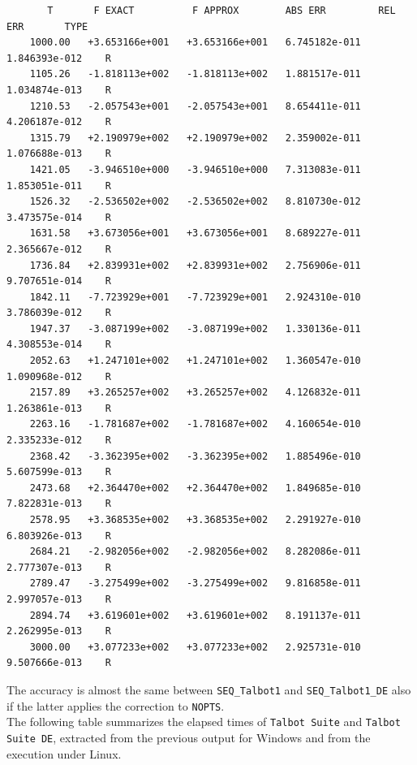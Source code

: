 \documentclass[a4paper,10pt]{report}%
\begin{document}
\begin{lstlisting}
       T       F EXACT          F APPROX        ABS ERR         REL ERR       TYPE
    1000.00   +3.653166e+001   +3.653166e+001   6.745182e-011   1.846393e-012    R
    1105.26   -1.818113e+002   -1.818113e+002   1.881517e-011   1.034874e-013    R
    1210.53   -2.057543e+001   -2.057543e+001   8.654411e-011   4.206187e-012    R
    1315.79   +2.190979e+002   +2.190979e+002   2.359002e-011   1.076688e-013    R
    1421.05   -3.946510e+000   -3.946510e+000   7.313083e-011   1.853051e-011    R
    1526.32   -2.536502e+002   -2.536502e+002   8.810730e-012   3.473575e-014    R
    1631.58   +3.673056e+001   +3.673056e+001   8.689227e-011   2.365667e-012    R
    1736.84   +2.839931e+002   +2.839931e+002   2.756906e-011   9.707651e-014    R
    1842.11   -7.723929e+001   -7.723929e+001   2.924310e-010   3.786039e-012    R
    1947.37   -3.087199e+002   -3.087199e+002   1.330136e-011   4.308553e-014    R
    2052.63   +1.247101e+002   +1.247101e+002   1.360547e-010   1.090968e-012    R
    2157.89   +3.265257e+002   +3.265257e+002   4.126832e-011   1.263861e-013    R
    2263.16   -1.781687e+002   -1.781687e+002   4.160654e-010   2.335233e-012    R
    2368.42   -3.362395e+002   -3.362395e+002   1.885496e-010   5.607599e-013    R
    2473.68   +2.364470e+002   +2.364470e+002   1.849685e-010   7.822831e-013    R
    2578.95   +3.368535e+002   +3.368535e+002   2.291927e-010   6.803926e-013    R
    2684.21   -2.982056e+002   -2.982056e+002   8.282086e-011   2.777307e-013    R
    2789.47   -3.275499e+002   -3.275499e+002   9.816858e-011   2.997057e-013    R
    2894.74   +3.619601e+002   +3.619601e+002   8.191137e-011   2.262995e-013    R
    3000.00   +3.077233e+002   +3.077233e+002   2.925731e-010   9.507666e-013    R
\end{lstlisting}
The accuracy is almost the same between {\tt SEQ\_Talbot1} and {\tt SEQ\_Talbot1\_DE} also if the latter
applies the correction to {\tt NOPTS}.
\\[.15in]
The following table summarizes the elapsed times of {\tt Talbot Suite} and {\tt Talbot Suite DE},
extracted from the previous output for Windows and from the execution under Linux.
\begin{table}[htb]
\centering
{}
\caption{\small Elapsed total times.}
\end{table}
\end{document}
